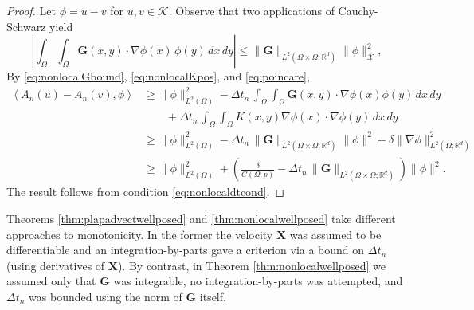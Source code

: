 \documentclass[final,onefignum]{siamart190516}
\newcommand\bG{\mathbf{G}}
\newcommand\bX{\mathbf{X}}
\newcommand{\grad}{\nabla}
\newcommand{\ip}[2]{\ensuremath{\left<#1,#2\right>}}
\newcommand\RR{\mathbb{R}}
\begin{document}
\begin{proof}  Let $\phi=u-v$ for $u,v\in\mathcal{K}$.  Observe that two applications of Cauchy-Schwarz yield
\begin{equation}
\left|\int_\Omega \int_\Omega \bG(x,y) \cdot \grad \phi(x)\,\phi(y) \,dx\,dy\right|
  \le \|\bG\|_{L^2(\Omega\times\Omega;\RR^d)} \|\phi\|_{\mathcal{X}}^2,   \label{eq:nonlocalGbound}
\end{equation}
By \eqref{eq:nonlocalGbound}, \eqref{eq:nonlocalKpos}, and \eqref{eq:poincare},
\begin{align*}
\ip{A_n(u)-A_n(v)}{\phi} &\ge \|\phi\|_{L^2(\Omega)}^2 - \Delta t_n\,\int_\Omega \int_\Omega \bG(x,y) \cdot \grad \phi(x) \phi(y)\,dx\,dy \\
    &\qquad + \Delta t_n\,\int_\Omega \int_\Omega K(x,y) \grad \phi(x) \cdot \grad \phi(y)\,dx\,dy \\
    &\ge \|\phi\|_{L^2(\Omega)}^2 - \Delta t_n\,\|\bG\|_{L^2(\Omega\times\Omega;\RR^d)} \|\phi\|^2 + \delta \|\grad\phi\|_{L^2(\Omega;\RR^d)}^2 \\
    &\ge \|\phi\|_{L^2(\Omega)}^2 + \left(\frac{\delta}{C(\Omega,p)} - \Delta t_n\,\|\bG\|_{L^2(\Omega\times\Omega;\RR^d)}\right) \|\phi\|^2.
\end{align*}
The result follows from condition \eqref{eq:nonlocaldtcond}. \end{proof}

Theorems \ref{thm:plapadvectwellposed} and \ref{thm:nonlocalwellposed} take different approaches to monotonicity.  In the former the velocity $\bX$ was assumed to be differentiable and an integration-by-parts gave a criterion via a bound on $\Delta t_n$ (using derivatives of $\bX$).  By contrast, in Theorem \ref{thm:nonlocalwellposed} we assumed only that $\bG$ was integrable, no integration-by-parts was attempted, and $\Delta t_n$ was bounded using the norm of $\bG$ itself.
\end{document}
